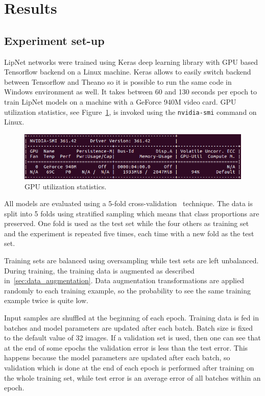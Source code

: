\documentclass[a4paper, 11pt, table]{article}
\begin{document}
\newpage
\section{Results}

\subsection{Experiment set-up}

LipNet networks were trained using Keras deep learning library with GPU based Tensorflow backend on a Linux machine. Keras allows to easily switch backend between Tensorflow and Theano so it is possible to run the same code in Windows environment as well. It takes between 60 and 130 seconds per epoch to train LipNet models on a machine with a GeForce 940M video card. GPU utilization statistics, see Figure~\ref{fig:nvidia_smi}, is invoked using the \texttt{nvidia-smi} command on Linux.

\begin{figure}[H]
\centering
\includegraphics[width=\textwidth]{nvidia_smi.png} 
\caption{GPU utilization statistics.}
\label{fig:nvidia_smi}
\end{figure}

All models are evaluated using a 5-fold cross-validation~\cite{Kohavi:1995:SCB:1643031.1643047} technique. The data is split into 5 folds using stratified sampling which means that class proportions are preserved. One fold is used as the test set while the four others as training set and the experiment is repeated five times, each time with a new fold as the test set.

Training sets are balanced using oversampling while test sets are left unbalanced. During training, the training data is augmented as described in~\ref{sec:data_augmentation}. Data augmentation transformations are applied randomly to each training example, so the probability to see  the same training example twice is quite low. 

Input samples are shuffled at the beginning of each epoch. Training data is fed in batches and model parameters are updated after each batch. Batch size is fixed to the default value of 32 images. If a validation set is used, then one can see that at the end of some epochs the validation error is less than the test error. This happens because the model parameters are updated after each batch, so validation which is done at the end of each epoch is performed after training on the whole training set, while test error is an average error of all batches within an epoch.
\end{document}

